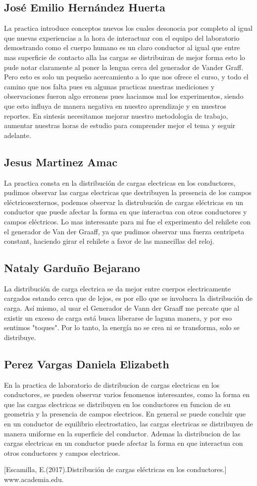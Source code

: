 \documentclass[10pt]{article}
\begin{document}
\begin{multicols}{2}
\subsection{José Emilio Hernández Huerta}
La practica introduce conceptos nuevos los cuales desonocia por completo al igual que nuevas experiencias a la hora de interactuar con el equipo del laboratorio demostrando como el cuerpo humano es un claro conductor al igual que entre mas superficie de contacto alla las cargas se distribuiran de mejor forma esto lo pude notar claramente al poner la lengua cerca del generador de Vander Graff. Pero esto es solo un pequeño acercamiento a lo que nos ofrece el curso, y todo el camino que nos falta pues en algunas practicas nuestras mediciones y observaciones fueron algo erroneas pues haciamos mal los experimentos, siendo que esto influya de manera negativa en nuestro aprendizaje y en nuestros reportes. En sintesis necesitamos mejorar nuestro metodologia de trabajo, aumentar nuestras horas de estudio para comprender mejor el tema y seguir adelante.
\subsection{Jesus Martinez Amac}
La practica consta en la distribución de cargas electricas en los conductores, pudimos observar las cargas electricas que destribuyen la presencia de los campos eléctricosexternos, podemos observar la distrubución de cargas eléctricas en un conductor  que puede afectar la forma en que interactua con otros conductores y campos eléctricos. Lo mas interesante para mi fue el experimento del rehilete con el generador de Van der Graaff, ya que pudimos observar una fuerza centripeta constant, haciendo girar el rehilete a favor de las manecillas del reloj.
\subsection{Nataly Garduño Bejarano}
La distribución de carga electrica se da mejor entre cuerpos electricamente cargados estando cerca que de lejos, es por ello que se involucra la distribución de carga. Así mismo, al usar el Generador de Vann der Graaff me percate que al existir un exceso de carga está busca liberarse de laguna manera, y por eso sentimos "toques". Por lo tanto, la energía no se crea ni se transforma, solo se distribuye. 
\subsection{Perez Vargas Daniela Elizabeth}
En la practica de laboratorio de distribucion de cargas electricas en los conductores, se pueden observar varios fenomenos interesantes, como la forma en que las cargas electricas se distribuyen en los conductores en funcion de su geometria y la presencia de campos electricos. En general se puede concluir que en un conductor de equilibrio electrostatico, las cargas electricas se distribuyen de manera uniforme en la superficie del conductor. Ademas la distribucion de las cargas electricas en un conductor puede afectar la forma en que interactua con otros conductores y campos electricos. 

\end{multicols}
\newpage
\clearpage
\begin{thebibliography}{0}
	\bibitem{}[Escamilla, E.(2017).Distribución de cargas eléctricas en los conductores.]
	www.academia.edu.
\end{thebibliography}
\end{document}
